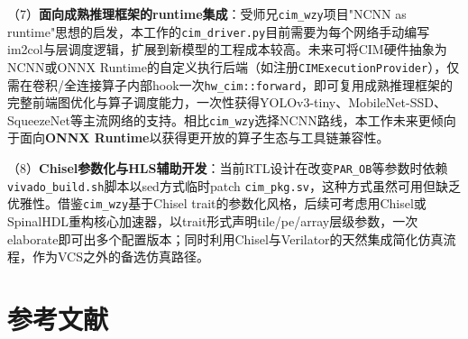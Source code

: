 \documentclass[12pt, a4paper]{article}
\begin{document}
（7）\textbf{面向成熟推理框架的runtime集成}：受师兄\texttt{cim\_wzy}项目"NCNN as runtime"思想的启发，本工作的\texttt{cim\_driver.py}目前需要为每个网络手动编写im2col与层调度逻辑，扩展到新模型的工程成本较高。未来可将CIM硬件抽象为NCNN或ONNX Runtime的自定义执行后端（如注册\texttt{CIMExecutionProvider}），仅需在卷积/全连接算子内部hook一次\texttt{hw\_cim::forward}，即可复用成熟推理框架的完整前端图优化与算子调度能力，一次性获得YOLOv3-tiny、MobileNet-SSD、SqueezeNet等主流网络的支持。相比\texttt{cim\_wzy}选择NCNN路线，本工作未来更倾向于面向\textbf{ONNX Runtime}以获得更开放的算子生态与工具链兼容性。

（8）\textbf{Chisel参数化与HLS辅助开发}：当前RTL设计在改变\texttt{PAR\_OB}等参数时依赖\texttt{vivado\_build.sh}脚本以sed方式临时patch \texttt{cim\_pkg.sv}，这种方式虽然可用但缺乏优雅性。借鉴\texttt{cim\_wzy}基于Chisel trait的参数化风格，后续可考虑用Chisel或SpinalHDL重构核心加速器，以trait形式声明tile/pe/array层级参数，一次elaborate即可出多个配置版本；同时利用Chisel与Verilator的天然集成简化仿真流程，作为VCS之外的备选仿真路径。

\section{参考文献}
\nocite{*}
\printbibliography[heading=none]
\end{document}
